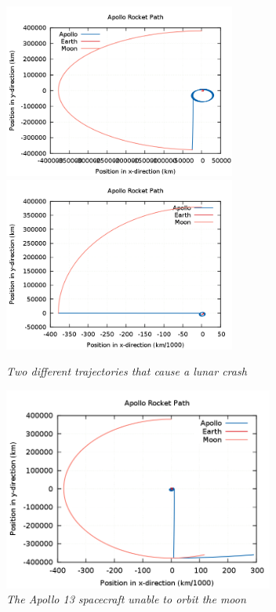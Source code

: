\documentclass[11pt]{article}
\begin{document}
\begin{figure}[H]
 \centerline{\includegraphics[width=3.0in]{mooncrash.png}\includegraphics[width=3.0in]{shotleft.png}}
\caption{\it \small{Two different trajectories that cause a lunar crash \label{fig3}}}
\end{figure}

\begin{figure}[H]
  \begin{center}
\centerline{\includegraphics[width=3.5in]{fail.png}}
\caption{\it \small{The Apollo 13 spacecraft unable to orbit the moon \label{fig4}}}
  \end{center}
\end{figure}
\end{document}

